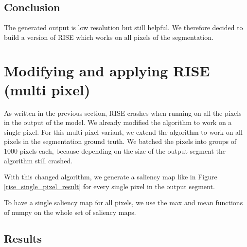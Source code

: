 \subsection{Conclusion}
The generated output is low resolution but still helpful. We therefore decided to build a version of RISE which works on all pixels of the segmentation.

\section{Modifying and applying RISE (multi pixel)}

As written in the previous section, RISE crashes when running on all the pixels in the output of the model. We already modified the algorithm to work on a single pixel. For this multi pixel variant, we extend the algorithm to work on all pixels in the segmentation ground truth. We batched the pixels into groups of 1000 pixels each, because depending on the size of the output segment the algorithm still crashed.

With this changed algorithm, we generate a saliency map like in Figure \ref{rise_single_pixel_result} for every single pixel in the output segment.

To have a single saliency map for all pixels, we use the max and mean functions of numpy on the whole set of saliency maps.

\subsection{Results}

